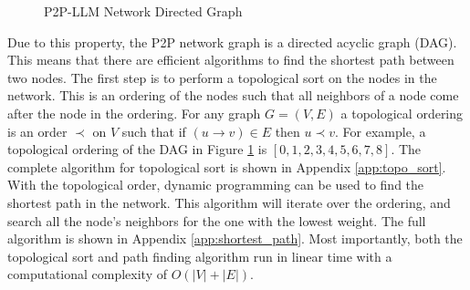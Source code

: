 \documentclass[preprint,twoside,11pt]{article}
\begin{document}
\begin{figure}
	\centering
	\caption{P2P-LLM Network Directed Graph}
	\label{fig:layered_graph}
\end{figure}

Due to this property, the P2P network graph is a directed acyclic graph (DAG). This means that there are efficient
algorithms to find the shortest path between two nodes. The first step is to perform a topological sort on the nodes in the network.
This is an ordering of the nodes such that all neighbors of a node come after the node in the ordering.
For any graph $G = (V, E)$ a topological ordering is an order $\prec$ on $V$ such that if $(u \rightarrow v) \in E$ then $u \prec v$.
For example, a topological ordering of the DAG in Figure \ref{fig:layered_graph} is $[0,1,2,3,4,5,6,7,8]$.
The complete algorithm for topological sort is shown in Appendix \ref{app:topo_sort}. With the topological order, dynamic programming can be used to find the shortest path in the network.
This algorithm will iterate over the ordering, and search all the node's neighbors for the one with the lowest weight.
The full algorithm is shown in Appendix \ref{app:shortest_path}. Most importantly, both the topological sort and path finding algorithm run in linear time
with a computational complexity of $O(|V| + |E|)$.
\end{document}
